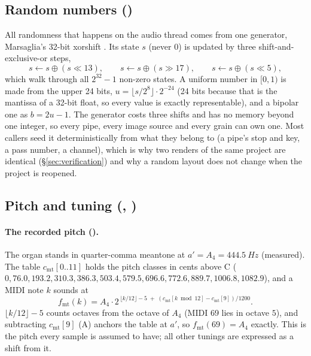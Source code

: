\subsection{Random numbers ()}
\label{sec:math-rng}
All randomness that happens on the audio thread comes from one generator, Marsaglia's 32-bit xorshift
\citep{marsaglia2003xorshift}. Its state $s$ (never 0) is updated by three shift-and-exclusive-or steps,
\begin{equation}
  s \leftarrow s \oplus (s \ll 13),\qquad s \leftarrow s \oplus (s \gg 17),\qquad s \leftarrow s \oplus (s \ll 5),
\end{equation}
which walk through all $2^{32}-1$ non-zero states. A uniform number in $[0,1)$ is made from the upper 24 bits,
$u = \lfloor s/2^{8}\rfloor\cdot 2^{-24}$ (24 bits because that is the mantissa of a 32-bit float, so every value
is exactly representable), and a bipolar one as $b=2u-1$. The generator costs three shifts and has no memory
beyond one integer, so every pipe, every image source and every grain can own one. Most callers seed it
deterministically from what they belong to (a pipe's stop and key, a pass number, a channel), which is why two
renders of the same project are identical (\S\ref{sec:verification}) and why a random layout does not change when
the project is reopened.

\subsection{Pitch and tuning (, )}
\label{sec:math-tuning}

\paragraph{The recorded pitch ().} The organ stands in quarter-comma meantone at
$a' = A_4 = \SI{444.5}{Hz}$ (measured). The table $c_\mathrm{mt}[0..11]$ holds the pitch classes in cents above C
($0, 76.0, 193.2, 310.3, 386.3, 503.4, 579.5, 696.6, 772.6, 889.7, 1006.8, 1082.9$), and a MIDI note $k$ sounds at
\begin{equation}
  f_\mathrm{mt}(k) = A_4 \cdot 2^{\,\lfloor k/12\rfloor - 5 \;+\; (c_\mathrm{mt}[k \bmod 12]-c_\mathrm{mt}[9])/1200}.
\end{equation}
$\lfloor k/12\rfloor-5$ counts octaves from the octave of $A_4$ (MIDI 69 lies in octave $5$), and subtracting
$c_\mathrm{mt}[9]$ (A) anchors the table at $a'$, so $f_\mathrm{mt}(69)=A_4$ exactly. This is the pitch every sample
is assumed to have; all other tunings are expressed as a shift from it.

